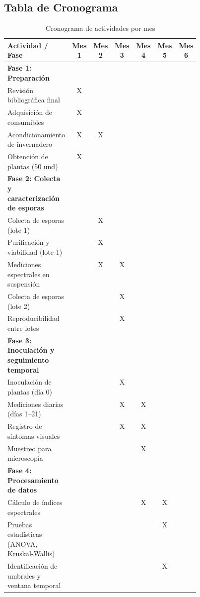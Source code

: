 \documentclass[12pt, a4paper]{article}
\begin{document}
\subsection{Tabla de Cronograma}
\begin{table}
	\caption{Cronograma de actividades por mes}
	\label{tab:cronograma}
	\begin{tabular}{p{0.45\linewidth} c c c c c c}
		\toprule
		\textbf{Actividad / Fase} & \textbf{Mes 1} & \textbf{Mes 2} & \textbf{Mes 3} & \textbf{Mes 4} & \textbf{Mes 5} & \textbf{Mes 6} \\
		\midrule
		\textbf{Fase 1: Preparación} & & & & & & \\
		\quad Revisión bibliográfica final & X & & & & & \\
		\quad Adquisición de consumibles & X & & & & & \\
		\quad Acondicionamiento de invernadero & X & X & & & & \\
		\quad Obtención de plantas (50 und) & X & & & & & \\
		\midrule
		\textbf{Fase 2: Colecta y caracterización de esporas} & & & & & & \\
		\quad Colecta de esporas (lote 1) & & X & & & & \\
		\quad Purificación y viabilidad (lote 1) & & X & & & & \\
		\quad Mediciones espectrales en suspensión & & X & X & & & \\
		\quad Colecta de esporas (lote 2) & & & X & & & \\
		\quad Reproducibilidad entre lotes & & & X & & & \\
		\midrule
		\textbf{Fase 3: Inoculación y seguimiento temporal} & & & & & & \\
		\quad Inoculación de plantas (día 0) & & & X & & & \\
		\quad Mediciones diarias (días 1--21) & & & X & X & & \\
		\quad Registro de síntomas visuales & & & X & X & & \\
		\quad Muestreo para microscopía & & & & X & & \\
		\midrule
		\textbf{Fase 4: Procesamiento de datos} & & & & & & \\
		\quad Cálculo de índices espectrales & & & & X & X & \\
		\quad Pruebas estadísticas (ANOVA, Kruskal-Wallis) & & & & & X & \\
		\quad Identificación de umbrales y ventana temporal & & & & & X & \\

\end{tabular}
\end{table}
\end{document}
